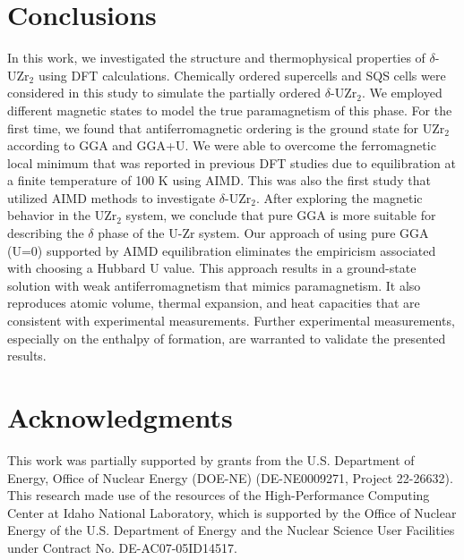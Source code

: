 \documentclass[preprint,12pt]{elsarticle}
\begin{document}
\section{Conclusions}
In this work, we investigated the structure and thermophysical properties of $\delta$-UZr$_2$ using DFT calculations. Chemically ordered supercells and SQS cells were considered in this study to simulate the partially ordered $\delta$-UZr$_2$. We employed different magnetic states to model the true paramagnetism of this phase. For the first time, we found that antiferromagnetic ordering is the ground state for UZr$_2$ according to GGA and GGA+U. We were able to overcome the ferromagnetic local minimum that was reported in previous DFT studies due to equilibration at a finite temperature of 100 K using AIMD. This was also the first study that utilized AIMD methods to investigate $\delta$-UZr$_2$. After exploring the magnetic behavior in the UZr$_2$ system, we conclude that pure GGA is more suitable for describing the $\delta$ phase of the U-Zr system. Our approach of using pure GGA (U=0) supported by AIMD equilibration eliminates the empiricism associated with choosing a Hubbard U value. This approach results in a ground-state solution with weak antiferromagnetism that mimics paramagnetism. It also reproduces atomic volume, thermal expansion, and heat capacities that are consistent with experimental measurements. Further experimental measurements, especially on the enthalpy of formation, are warranted to validate the presented results.  

\FloatBarrier

\FloatBarrier
\section{Acknowledgments}

This work was partially supported by grants from the U.S. Department of Energy, Office of Nuclear Energy (DOE-NE) (DE-NE0009271, Project 22-26632). This research made use of the resources of the High-Performance Computing Center at Idaho National Laboratory, which is supported by the Office of Nuclear Energy of the U.S. Department of Energy and the Nuclear Science User Facilities under Contract No. DE-AC07-05ID14517.
\end{document}
